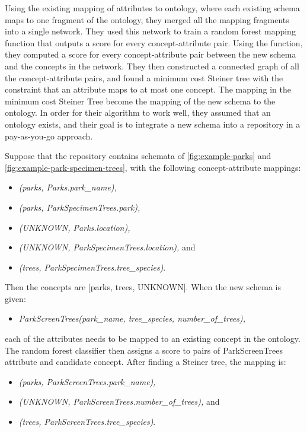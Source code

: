 Using the existing mapping of attributes to ontology, where each existing schema maps to one fragment of the ontology, they merged all the mapping fragments into a single network. They used this network to train a random forest mapping function that outputs a score for every concept-attribute pair. Using the function, they computed a score for every concept-attribute pair between the new schema and the concepts in the network. They then constructed a connected graph of all the concept-attribute pairs, and found a minimum cost Steiner tree with the constraint that an attribute maps to at most one concept. The mapping in the minimum cost Steiner Tree become the mapping of the new schema to the ontology. In order for their algorithm to work well, they assumed that an ontology exists, and their goal is to integrate a new schema into a repository in a pay-as-you-go approach.

Suppose that the repository contains schemata of \autoref{fig:example-parks} and \autoref{fig:example-park-specimen-trees}, with the following concept-attribute mappings:
\begin{itemize}
	\item[] \textit{(parks, Parks.park\_name),}
	\item[] \textit{(parks, ParkSpecimenTrees.park),}
	\item[] \textit{(UNKNOWN, Parks.location),}
	\item[] \textit{(UNKNOWN, ParkSpecimenTrees.location),} and
	\item[] \textit{(trees, ParkSpecimenTrees.tree\_species)}.
\end{itemize}

Then the concepts are [parks, trees, UNKNOWN]. When the new schema is given:
\begin{itemize}
	\item[] \textit{ParkScreenTrees(park\_name, tree\_species, number\_of\_trees),}
\end{itemize}
each of the attributes needs to be mapped to an existing concept in the ontology. The random forest classifier then assigns a score to pairs of ParkScreenTrees attribute and candidate concept. 
After finding a Steiner tree, the mapping is:
\begin{itemize}
	\item[] \textit{(parks, ParkScreenTrees.park\_name),}
	\item[] \textit{(UNKNOWN, ParkScreenTrees.number\_of\_trees),} and
	\item[] \textit{(trees, ParkScreenTrees.tree\_species)}.
\end{itemize}

